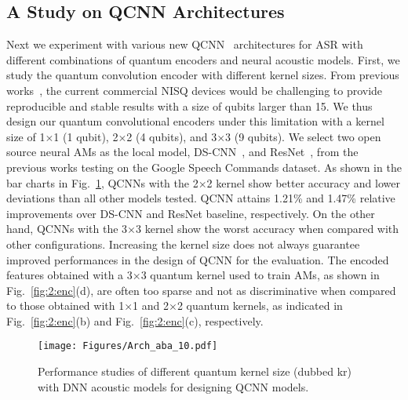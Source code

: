 \documentclass{article}
\begin{document}
\subsection{A Study on QCNN Architectures}
\label{sec:4:4}
Next we experiment with various new QCNN~\cite{henderson2020quanvolutional} architectures for ASR with different combinations of quantum encoders and neural acoustic models. First, we study the quantum convolution encoder with different kernel sizes. From previous works~\cite{chen2020quantum, chen2020variational}, the current commercial NISQ devices would be challenging to provide reproducible and stable results with a size of qubits larger than 15.
We thus design our quantum convolutional encoders under this limitation with a kernel size of 1$\times$1 (1 qubit), 2$\times$2 (4 qubits), and 3$\times$3 (9 qubits).
We select two open source neural AMs as the local model, DS-CNN~\cite{zhang2017hello}, and ResNet~\cite{warden2018speech}, from the previous works testing on the Google Speech Commands dataset. As shown in the bar charts in Fig.~\ref{fig:aba}, QCNNs with the 2$\times$2 kernel show better accuracy and lower deviations than all other models tested. QCNN attains 1.21\% and 1.47\% relative improvements over DS-CNN and ResNet baseline, respectively. On the other hand, QCNNs with the 3$\times$3 kernel show the worst accuracy when compared with other configurations.
Increasing the kernel size does not always guarantee improved performances in the design of QCNN for the evaluation. The encoded features obtained with a 3$\times$3 quantum kernel used to train AMs, as shown in Fig.~\ref{fig:2:enc}(d), are often too sparse and not as discriminative when compared to those obtained with 1$\times$1 and 2$\times$2 quantum kernels, as indicated in Fig.~\ref{fig:2:enc}(b) and Fig.~\ref{fig:2:enc}(c), respectively.


\begin{figure}[ht!]
\begin{center}
\vspace{-2mm}
  \centering    
\texttt{[image: Figures/Arch\_aba\_10.pdf]}
\end{center}
\vspace{-0.4cm}
  \caption{Performance studies of different quantum kernel size (dubbed kr) with DNN acoustic models for designing QCNN models. 
  } 
\label{fig:aba}
\end{figure}
\end{document}
